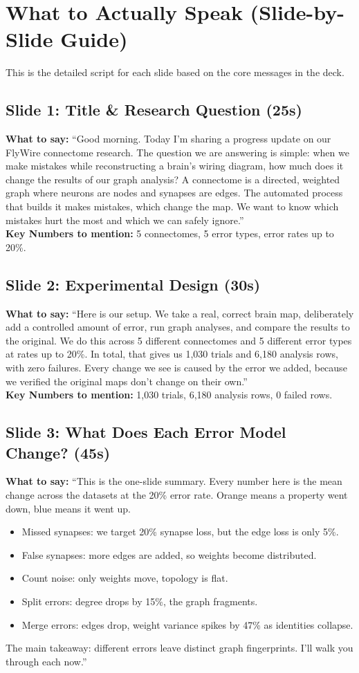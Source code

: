 \documentclass[11pt]{article}
\begin{document}
\newpage
\section{What to Actually Speak (Slide-by-Slide Guide)}
This is the detailed script for each slide based on the core messages in the deck.

\subsection*{Slide 1: Title \& Research Question (25s)}
\textbf{What to say:} 
``Good morning. Today I'm sharing a progress update on our FlyWire connectome research. The question we are answering is simple: when we make mistakes while reconstructing a brain's wiring diagram, how much does it change the results of our graph analysis? A connectome is a directed, weighted graph where neurons are nodes and synapses are edges. The automated process that builds it makes mistakes, which change the map. We want to know which mistakes hurt the most and which we can safely ignore.''\\
\textbf{Key Numbers to mention:} 5 connectomes, 5 error types, error rates up to 20\%.

\subsection*{Slide 2: Experimental Design (30s)}
\textbf{What to say:} 
``Here is our setup. We take a real, correct brain map, deliberately add a controlled amount of error, run graph analyses, and compare the results to the original. We do this across 5 different connectomes and 5 different error types at rates up to 20\%. In total, that gives us 1,030 trials and 6,180 analysis rows, with zero failures. Every change we see is caused by the error we added, because we verified the original maps don't change on their own.''\\
\textbf{Key Numbers to mention:} 1,030 trials, 6,180 analysis rows, 0 failed rows.

\subsection*{Slide 3: What Does Each Error Model Change? (45s)}
\textbf{What to say:} 
``This is the one-slide summary. Every number here is the mean change across the datasets at the 20\% error rate. Orange means a property went down, blue means it went up. 
\begin{itemize}
    \item Missed synapses: we target 20\% synapse loss, but the edge loss is only 5\%.
    \item False synapses: more edges are added, so weights become distributed.
    \item Count noise: only weights move, topology is flat.
    \item Split errors: degree drops by 15\%, the graph fragments.
    \item Merge errors: edges drop, weight variance spikes by 47\% as identities collapse.
\end{itemize}
The main takeaway: different errors leave distinct graph fingerprints. I'll walk you through each now.''
\end{document}
